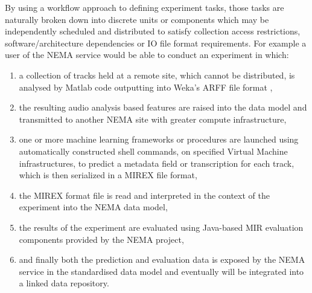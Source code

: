 \documentclass[conference]{IEEEtran}
\begin{document}
By using a workflow approach to defining experiment tasks, those tasks are naturally broken down into discrete units or components which may be independently scheduled and distributed to satisfy collection access restrictions, software/architecture dependencies or IO file format requirements. For example a user of the NEMA service would be able to conduct an experiment in which:
\begin{enumerate}
\item a collection of tracks held at a remote site, which cannot be distributed, is analysed by Matlab code outputting into Weka's ARFF file format \cite{witten1999wpm}, 
\item the resulting audio analysis based features are raised into the data model and transmitted to another NEMA site with greater compute infrastructure, 
\item one or more machine learning frameworks or procedures are launched using automatically constructed shell commands, on specified Virtual Machine infrastructures, to predict a metadata field or transcription for each track, which is then serialized in a MIREX file format,
\item the MIREX format file is read and interpreted in the context of the experiment into the NEMA data model,
\item the results of the experiment are evaluated using Java-based MIR evaluation components provided by the NEMA project,
\item and finally both the prediction and evaluation data is exposed by the NEMA service in the standardised data model and eventually will be integrated into a linked data repository.
\end{enumerate}
\end{document}
